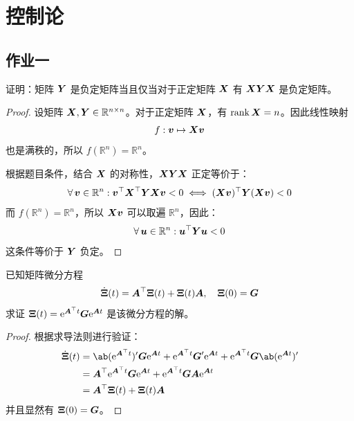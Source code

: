 \section{控制论}

\subsection{作业一}

\begin{problem}
	证明：矩阵 $\boldsymbol{Y}$ 是负定矩阵当且仅当对于正定矩阵 $\boldsymbol{X}$ 有 $\boldsymbol{X} \boldsymbol{Y} \boldsymbol{X}$ 是负定矩阵。

	\begin{proof}
		设矩阵 $\boldsymbol{X}, \boldsymbol{Y} \in \mathbb{R}^{n \times n}$。对于正定矩阵 $\boldsymbol{X}$，有 $\rank \boldsymbol{X} = n$。因此线性映射
		$$
		f: \boldsymbol{v} \mapsto \boldsymbol{X} \boldsymbol{v}
		$$
		也是满秩的，所以 $f(\mathbb{R}^{n}) = \mathbb{R}^{n}$。

		根据题目条件，结合 $\boldsymbol{X}$ 的对称性，$\boldsymbol{X} \boldsymbol{Y} \boldsymbol{X}$ 正定等价于：
		$$
		\forall\,\boldsymbol{v} \in \mathbb{R}^{n}: \boldsymbol{v}^\top \boldsymbol{X}^\top \boldsymbol{Y} \boldsymbol{X} \boldsymbol{v} < 0 \iff (\boldsymbol{X} \boldsymbol{v})^\top \boldsymbol{Y} (\boldsymbol{X} \boldsymbol{v}) < 0
		$$
		而 $f(\mathbb{R}^{n}) = \mathbb{R}^{n}$，所以 $\boldsymbol{X} \boldsymbol{v}$ 可以取遍 $\mathbb{R}^{n}$，因此：
		$$
		\forall\,\boldsymbol{u} \in \mathbb{R}^{n}: \boldsymbol{u}^\top \boldsymbol{Y} \boldsymbol{u} < 0
		$$
		这条件等价于 $\boldsymbol{Y}$ 负定。
	\end{proof}
\end{problem}

\begin{problem}
	已知矩阵微分方程
	$$
	\dot{\boldsymbol{\Xi}}(t) = \boldsymbol{A}^\top \boldsymbol{\Xi}(t) + \boldsymbol{\Xi}(t) \boldsymbol{A}, \quad \boldsymbol{\Xi}(0) = \boldsymbol{G}
	$$
	求证 $\boldsymbol{\Xi}(t) = \mathrm{e}^{\boldsymbol{A}^\top t} \boldsymbol{G} \mathrm{e}^{\boldsymbol{A} t}$ 是该微分方程的解。

	\begin{proof}
		根据求导法则进行验证：
		$$
		\begin{aligned}
			\dot{\matr{\Xi}}(t) & = \ab(\E^{\matr{A}^\top t})' \matr{G} \E^{\matr{A} t} + \E^{\matr{A}^\top t} \matr{G}' \E^{\matr{A} t} + \E^{\matr{A}^\top t} \matr{G} \ab(\E^{\matr{A} t})' \\
			& = \matr{A}^\top \E^{\matr{A}^\top t} \matr{G} \E^{\matr{A} t} + \E^{\matr{A}^\top t} \matr{G} \matr{A} \E^{\matr{A} t} \\
			& = \matr{A}^\top \matr{\Xi}(t) + \matr{\Xi}(t) \matr{A}
		\end{aligned}
		$$
		并且显然有 $\boldsymbol{\Xi}(0) = \boldsymbol{G}$。
	\end{proof}
\end{problem}

